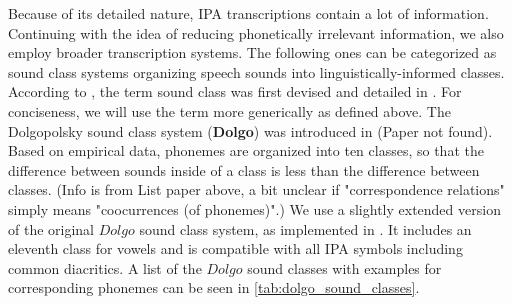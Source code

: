 Because of its detailed nature, IPA transcriptions contain a lot of information.
Continuing with the idea of reducing phonetically irrelevant information, we also employ broader transcription systems.
The following ones can be categorized as sound class systems organizing speech sounds into linguistically-informed classes.\\
According to \cite{list2012multiple}, the term sound class was first devised and detailed in \cite{dolgopolsky1986dolgoOriginal}.
For conciseness, we will use the term more generically as defined above.
The Dolgopolsky sound class system (\textbf{Dolgo}) was introduced in \cite{dolgopolsky1986dolgoOriginal} (Paper not found).
Based on empirical data, phonemes are organized into ten classes, so that the difference between sounds inside of a class is less than the difference between classes.
(Info is from List paper above, a bit unclear if "correspondence relations" simply means "coocurrences (of phonemes)".)
We use a slightly extended version of the original $Dolgo$ sound class system, as implemented in \cite{list2018cltsIntro}.
It includes an eleventh class for vowels and is compatible with all IPA symbols including common diacritics.
A list of the $Dolgo$ sound classes with examples for corresponding phonemes can be seen in \ref{tab:dolgo_sound_classes}.


